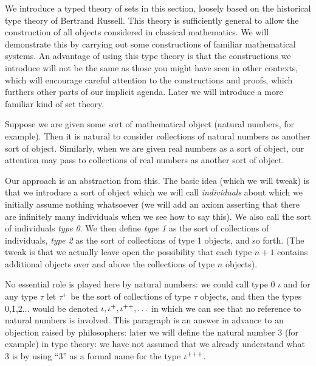 \documentclass[12pt]{book}
\begin{document}
We introduce a typed theory of sets in this section, loosely based on
the historical type theory of Bertrand Russell.  This theory is
sufficiently general to allow the construction of all objects
considered in classical mathematics.  We will demonstrate this by
carrying out some constructions of familiar mathematical systems.  An
advantage of using this type theory is that the constructions we
introduce will not be the same as those you might have seen in other
contexts, which will encourage careful attention to the constructions
and proofs, which furthers other parts of our implicit agenda.  Later
we will introduce a more familiar kind of set theory.

Suppose we are given some sort of mathematical object (natural
numbers, for example).  Then it is natural to consider collections of
natural numbers as another sort of object.  Similarly, when we are
given real numbers as a sort of object, our attention may pass to
collections of real numbers as another sort of object.

Our approach is an abstraction from this.  The basic idea (which we will tweak) is that we introduce a sort of
object which we will call {\em individuals\/} about which
we initially assume nothing whatsoever (we will add an axiom asserting
that there are infinitely many individuals when we see how to say
this).  We also call the sort of individuals {\em type 0\/}.  We then
define {\em type 1\/} as the sort of collections of individuals, {\em
type 2\/} as the sort of collections of type 1 objects, and so forth.
(The tweak is that we actually leave open the possibility that each type $n+1$ contains additional objects over and above the collections of type $n$ objects).

No essential role is played here by natural numbers: we could call
type 0 $\iota$ and for any type $\tau$ let $\tau^+$ be the sort of
collections of type $\tau$ objects, and then the types 0,1,2$\ldots$
would be denoted $\iota,\iota^+,\iota^{\bf ++},\ldots$ in which we can see
that no reference to natural numbers is involved.  This paragraph is
an answer in advance to an objection raised by philosophers: later we
will define the natural number 3 (for example) in type theory: we have
not assumed that we already understand what 3 is by using ``3'' as a
formal name for the type $\iota^{\bf +++}$.
\end{document}
